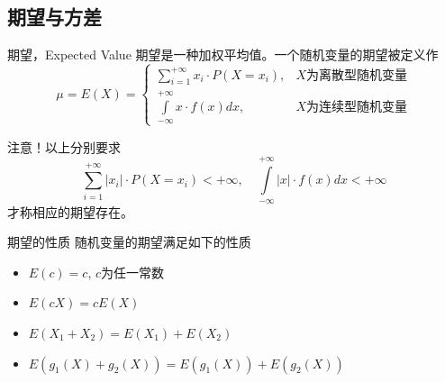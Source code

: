 \subsection{期望与方差}


\begin{frame}

\begin{block}{期望，Expected Value}
期望是一种加权平均值。一个随机变量的期望被定义作
$$\mu = E(X) = \begin{cases}
\sum\limits_{i=1}^{+\infty} x_i\cdot P(X=x_i), & \text{$X$为离散型随机变量} \\
\int\limits_{-\infty}^{+\infty} x\cdot f(x)dx, & \text{$X$为连续型随机变量}
\end{cases}$$

\vspace{1em}
\pause

{\color{red}注意}！以上分别要求
$$\sum\limits_{i=1}^{+\infty} \vert x_i \vert \cdot P(X=x_i) < +\infty,\quad \int\limits_{-\infty}^{+\infty} \vert x \vert \cdot f(x)dx < +\infty$$
才称相应的期望存在。
\end{block}

\end{frame}


\begin{frame}

\begin{block}{期望的性质}
随机变量的期望满足如下的性质
\begin{itemize}
\item $E(c) = c$, $c$为任一常数
\item $E(cX) = cE(X)$
\item $E(X_1 + X_2) = E(X_1) + E(X_2)$
\item $E(g_1(X) + g_2(X)) = E(g_1(X)) + E(g_2(X))$
\end{itemize}
\end{block}

\end{frame}


